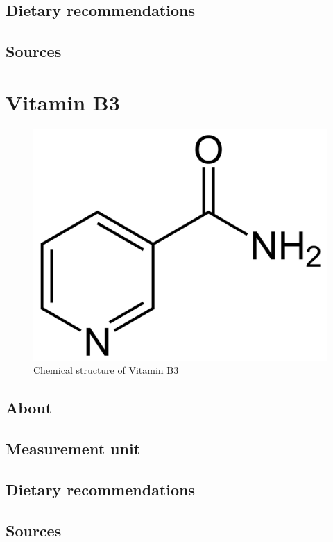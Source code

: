 \documentclass{book}
\begin{document}
\section{Dietary recommendations}


\section{Sources}


\chapter{Vitamin B3}
\begin{figure}[h]
	\centering \includegraphics[width=0.75\linewidth]{images/Vitamin_B3_chemical_structure}
	\caption{Chemical structure of Vitamin B3}
\end{figure}

\section{About}


\section{Measurement unit}


\section{Dietary recommendations}


\section{Sources}
\end{document}
